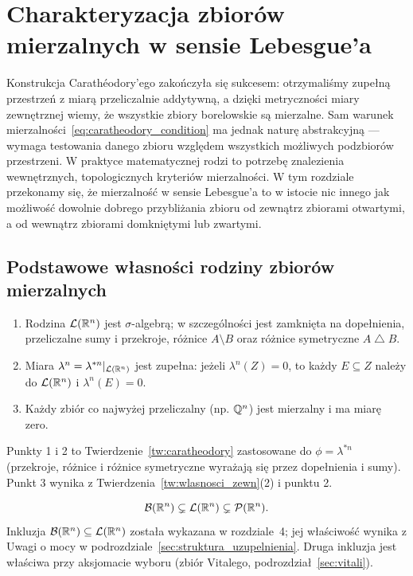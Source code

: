 \section{Charakteryzacja zbiorów mierzalnych w sensie Lebesgue'a}

Konstrukcja Carathéodory'ego zakończyła się sukcesem: otrzymaliśmy zupełną przestrzeń z miarą przeliczalnie addytywną, a dzięki metryczności miary zewnętrznej wiemy, że wszystkie zbiory borelowskie są mierzalne. Sam warunek mierzalności~\eqref{eq:caratheodory_condition} ma jednak naturę abstrakcyjną — wymaga testowania danego zbioru względem wszystkich możliwych podzbiorów przestrzeni. W praktyce matematycznej rodzi to potrzebę znalezienia wewnętrznych, topologicznych kryteriów mierzalności. W tym rozdziale przekonamy się, że mierzalność w sensie Lebesgue'a to w istocie nic innego jak możliwość dowolnie dobrego przybliżania zbioru od zewnątrz zbiorami otwartymi, a od wewnątrz zbiorami domkniętymi lub zwartymi.

\subsection{Podstawowe własności rodziny zbiorów mierzalnych}
\begin{tw}\label{tw:wlasnosci_L}
    \leavevmode
    \begin{enumerate}
        \item Rodzina $\mathcal{L}({\mathbb{R}^{n}})$ jest $\sigma$-algebrą; w szczególności jest zamknięta na dopełnienia, przeliczalne sumy i przekroje, różnice $A \setminus B$ oraz różnice symetryczne $A \mathbin{\triangle} B$.
        \item Miara $\lambda^n = \lambda^{*n}|_{\mathcal{L}({\mathbb{R}^{n}})}$ jest zupełna: jeżeli $\lambda^n(Z) = 0$, to każdy $E \subseteq Z$ należy do $\mathcal{L}({\mathbb{R}^{n}})$ i $\lambda^n(E) = 0$.
        \item Każdy zbiór co najwyżej przeliczalny (np. $\mathbb{Q}^n$) jest mierzalny i ma miarę zero.
    \end{enumerate}
\end{tw}
\begin{dow}
    Punkty 1 i 2 to Twierdzenie~\ref{tw:caratheodory} zastosowane do $\phi = \lambda^{*n}$ (przekroje, różnice i różnice symetryczne wyrażają się przez dopełnienia i sumy). Punkt 3 wynika z Twierdzenia~\ref{tw:wlasnosci_zewn}(2) i punktu 2.
\end{dow}

\begin{fakt}
    \[
        \mathcal{B}({\mathbb{R}^{n}}) \subsetneq \mathcal{L}({\mathbb{R}^{n}}) \subsetneq \mathcal{P}(\mathbb{R}^{n}).
    \]
    Inkluzja $\mathcal{B}({\mathbb{R}^{n}}) \subseteq \mathcal{L}({\mathbb{R}^{n}})$ została wykazana w rozdziale~4; jej właściwość wynika z Uwagi o mocy w podrozdziale~\ref{sec:struktura_uzupelnienia}. Druga inkluzja jest właściwa przy aksjomacie wyboru (zbiór Vitalego, podrozdział~\ref{sec:vitali}).
\end{fakt}

